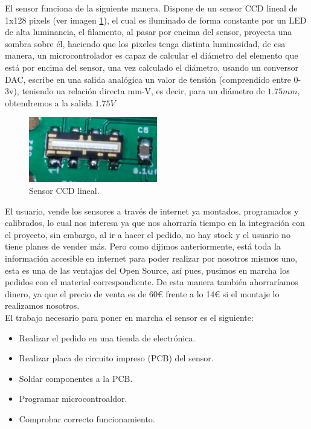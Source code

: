 El sensor funciona de la siguiente manera. Dispone de un sensor CCD lineal de 1x128 pixels (ver imagen \ref{fig:sens_CCD}), el cual es iluminado de forma constante por un LED de alta luminancia, el filamento, al pasar por encima del sensor, proyecta una sombra sobre él, haciendo que los pixeles tenga distinta luminosidad, de esa manera, un microcontrolador es capaz de calcular el diámetro del elemento que está por encima del sensor, una vez calculado el diámetro, usando un conversor DAC, escribe en una salida analógica un valor de tensión  (comprendido entre 0-3v), teniendo ua relación directa mm-V, es decir, para un diámetro de $1.75 mm$, obtendremos a la salida $1.75 V$\\
   \begin{figure}[H]
            \centering
            \includegraphics[width=0.5\textwidth]{images/sensor/IMG_20150414_135533_.jpg}
            \caption{Sensor CCD lineal.}
            \label{fig:sens_CCD}
    \end{figure}

El usuario, vende los sensores a través de internet ya montados, programados y calibrados, lo cual nos interesa ya que nos ahorraría tiempo en la integración con el proyecto, sin embargo, al ir a hacer el pedido, no hay stock y el usuario no tiene planes de vender más. Pero como dijimos anteriormente, está toda la información accesible en internet para poder realizar por nosotros mismos uno, esta es una de las ventajas del Open Source, así pues, pusimos en marcha los pedidos con el material correspondiente. De esta manera también ahorraríamos dinero, ya que el precio de venta es de 60\euro{} frente a lo 14\euro{} si el montaje lo realizamos nosotros.\\

El trabajo necesario para poner en marcha el sensor es el siguiente:

\begin{itemize}
\item{Realizar el pedido en una tienda de electrónica.}
\item{Realizar placa de circuito impreso (PCB) del sensor.}
\item{Soldar componentes a la PCB.}
\item{Programar microcontroaldor.}
\item{Comprobar correcto funcionamiento.}
\end{itemize}


